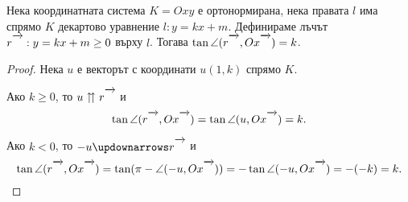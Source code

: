 \documentclass[numbers=endperiod, DIV=15]{scrartcl}
\begin{document}
\begin{proposition}
  Нека координатната система $K = Oxy$ е ортонормирана, нека правата $l$ има спрямо $K$ декартово уравнение $l: y = kx + m$. Дефинираме лъчът $r\Ray : y = kx + m \geq 0$ върху $l$. Тогава $\tan \angle(r\Ray, Ox\Ray) = k$.
\end{proposition}
\begin{proof}
  Нека $u$ е векторът с координати $u(1, k)$ спрямо $K$.

  Ако $k \geq 0$, то $u \upuparrows r\Ray$ и
  \begin{displaymath}
     \tan \angle(r\Ray, Ox\Ray) = \tan \angle(u, Ox\Ray) = k.
  \end{displaymath}

  Ако $k < 0$, то $-u \updownarrows r\Ray$ и
  \begin{displaymath}
    \tan \angle(r\Ray, Ox\Ray) = \tan(\pi - \angle(-u, Ox\Ray)) = -\tan \angle(-u, Ox\Ray) = -(-k) = k.
  \end{displaymath}
\end{proof}
\end{document}
